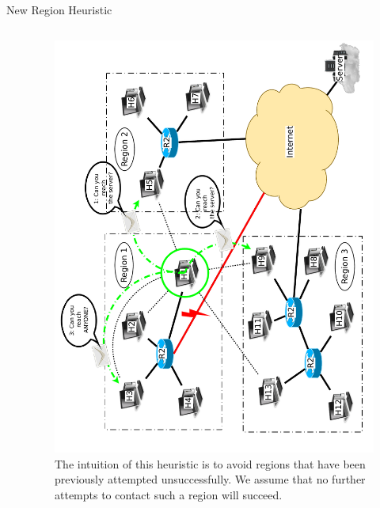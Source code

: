 \documentclass[pdftex]{beamer}
\begin{document}
\begin{frame}{New Region Heuristic}
\begin{columns}
\begin{column}{.5\textwidth}



\end{column}
	
\begin{column}{.5\textwidth}
\begin{figure}
\includegraphics[height=\textwidth,angle=-90]{new_region_all}
\caption{The intuition of this heuristic is to avoid regions that have been previously attempted unsuccessfully.  We assume that no further attempts to contact such a region will succeed.}
\end{figure}
\end{column}

\end{columns}
\end{frame}
\end{document}

